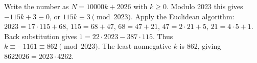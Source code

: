Write the number as $N=10000k+2026$ with $k\ge0$. Modulo 2023 this gives $-115k+3\equiv0$, or $115k\equiv3\pmod{2023}$. Apply the Euclidean algorithm: $2023=17\cdot115+68$, $115=68+47$, $68=47+21$, $47=2\cdot21+5$, $21=4\cdot5+1$. Back substitution gives $1=22\cdot2023-387\cdot115$. Thus $k\equiv-1161\equiv862\pmod{2023}$. The least nonnegative $k$ is 862, giving $\boxed{8622026}=2023\cdot4262$.
